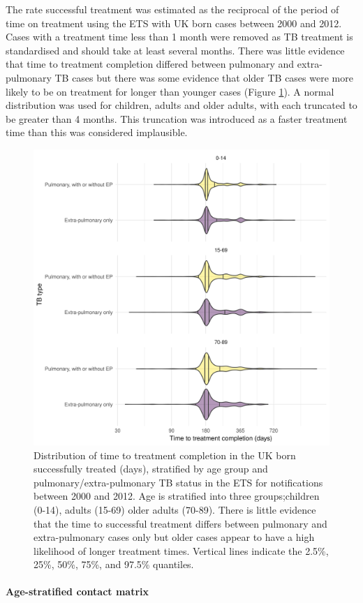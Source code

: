 \documentclass[11pt,twoside]{bristolthesis}
\begin{document}
  The rate successful treatment was estimated as the reciprocal of the period of time on treatment using the ETS with UK born cases between 2000 and 2012. Cases with a treatment time less than 1 month were removed as TB treatment is standardised and should take at least several months. There was little evidence that time to treatment completion differed between pulmonary and extra-pulmonary TB cases but there was some evidence that older TB cases were more likely to be on treatment for longer than younger cases (Figure \ref{fig:tb-treat-time-succ}). A normal distribution was used for children, adults and older adults, with each truncated to be greater than 4 months. This truncation was introduced as a faster treatment time than this was considered implausible.
  \begin{figure}
  
  {\centering \includegraphics[width=0.8\linewidth,]{chapters/model-development/resources/figure/time_cure} 
  
  }
  
  \caption[Distribution of time to treatment completion in the UK born successfully treated (days), stratified by age group and pulmonary/extra-pulmonary TB status in the ETS for notifications between 2000 and 2012.]{Distribution of time to treatment completion in the UK born successfully treated (days), stratified by age group and pulmonary/extra-pulmonary TB status in the ETS for notifications between 2000 and 2012. Age is stratified into three groups;children (0-14), adults (15-69) older adults (70-89). There is little evidence that the time to successful treatment differs between pulmonary and extra-pulmonary cases only but older cases appear to have a high likelihood of longer treatment times. Vertical lines indicate the 2.5\%, 25\%, 50\%, 75\%, and 97.5\% quantiles.}\label{fig:tb-treat-time-succ}
  \end{figure}
  \hypertarget{contact-matrix}{%
  \paragraph{Age-stratified contact matrix}\label{contact-matrix}}
  
\end{document}
